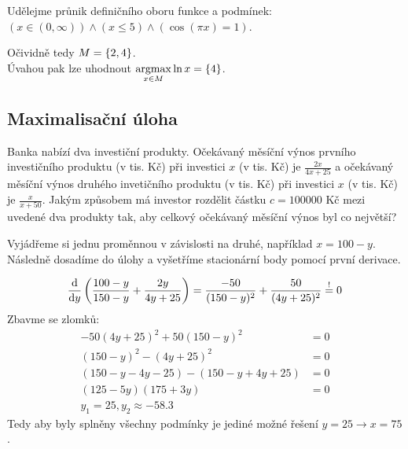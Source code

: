 Udělejme průnik definičního oboru funkce a podmínek: $(x \in (0, \infty)) \land (x \leq 5) \land (\cos(\pi x)=1)$.

\begin{multicols}{2}
  \begin{figure}[H]
    \center
  \end{figure}
\columnbreak
      Očividně tedy $M = \left\lbrace 2,4 \right\rbrace$.\\
      Úvahou pak lze uhodnout $\underset{x \in M}{\operatorname*{argmax}} \ln x = \left\lbrace 4 \right\rbrace$.
\end{multicols}

\subsection{Maximalisační úloha}
Banka nabízí dva investiční produkty. Očekávaný měsíční výnos prvního investičního produktu (v tis. Kč) při investici $x$
(v tis. Kč) je $\frac{2x}{4x+25}$ a očekávaný měsíční výnos druhého invetičního produktu (v tis. Kč) při investici $x$
(v tis. Kč) je $\frac{x}{x+50}$. Jakým způsobem má investor rozdělit částku $c = 100000$ Kč mezi uvedené dva produkty tak,
aby celkový očekávaný měsíční výnos byl co největší?


Vyjádřeme si jednu proměnnou v závislosti na druhé, například $x = 100 - y$. Následně dosadíme do úlohy a vyšetříme
stacionární body pomocí první derivace.

\[
    \frac{\mathop{}\!\mathrm{d}}{\mathop{}\!\mathrm{d} y} \left(\frac{100-y}{150-y} + \frac{2y}{4y + 25}\right)= \frac{-50}{(150-y)^2} + \frac{50}{(4y + 25)^2}
    \stackrel{!}{=}0
\]
Zbavme se zlomků:
\begin{align*}
    -50(4y + 25)^2 + 50(150-y)^2 &= 0 \\
    (150-y)^2 - (4y + 25)^2 &= 0 \\
    (150-y -4y - 25) - (150-y + 4y + 25) &=0\\
    (125 - 5y) (175 + 3y) &=0 \\
    y_1 = 25, y_2 \approx -58.3
\end{align*}
Tedy aby byly splněny všechny podmínky je jediné možné řešení $y = 25 \rightarrow x = 75$.

